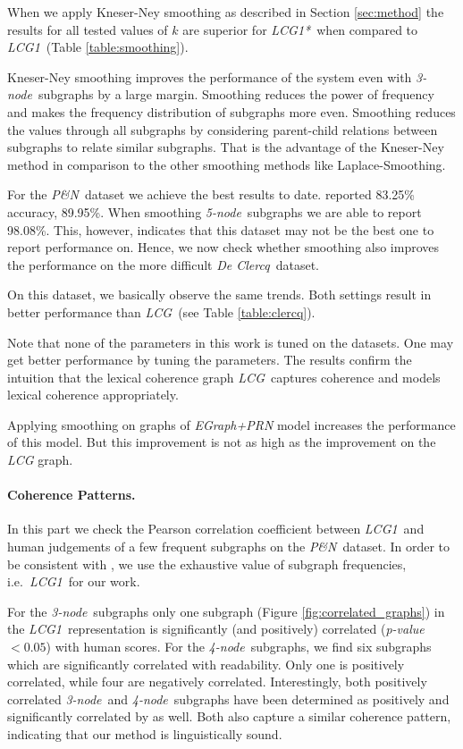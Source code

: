 When we apply Kneser-Ney smoothing as described in Section
\ref{sec:method} the results for all tested values of $k$ are superior
for \emph{LCG1*}\ when compared to \emph{LCG1}\ (Table
\ref{table:smoothing}).

Kneser-Ney smoothing improves the performance of the system even with
\emph{3-node}\ subgraphs by a large margin. Smoothing reduces the
power of frequency and makes the frequency distribution of subgraphs
more even. Smoothing reduces the values through all
subgraphs by considering parent-child relations between subgraphs to
relate similar subgraphs. That is the advantage of the Kneser-Ney
method in comparison to the other smoothing methods like
Laplace-Smoothing. 

For the \emph{P\&N}\ dataset we achieve the best results to
date.  reported 83.25\% accuracy, 
89.95\%. When smoothing \emph{5-node}\ subgraphs we are able to report
98.08\%. This, however, indicates that this dataset may not be the
best one to report performance on. Hence, we now check whether
smoothing also improves the performance on the more difficult
\emph{De Clercq}\ dataset.

On this dataset, we basically observe the same trends. Both settings result in better performance than \emph{LCG}\ (see Table \ref{table:clercq}). 

Note that none of the parameters in this work is tuned on the
datasets. One may get better performance by tuning the parameters.
The results confirm the intuition
that the lexical coherence graph \emph{LCG}\ captures coherence and
models lexical coherence appropriately.

Applying smoothing on graphs of \emph{EGraph+PRN} model increases the performance of this model. But this improvement is not as high as the improvement on the \emph{LCG} graph.

\paragraph{Coherence Patterns.}
In this part we check the Pearson correlation coefficient between
\emph{LCG1}\ and human judgements of a few frequent subgraphs on the
\emph{P\&N}\ dataset. In order to be consistent with
, we use the exhaustive value of subgraph
frequencies, i.e.\ \emph{LCG1}\ for our work.

For the \emph{3-node}\ subgraphs only one subgraph (Figure
\ref{fig:correlated_graphs}) in the \emph{LCG1}\ representation is
significantly (and positively) correlated (\emph{p-value}$<0.05$) with
human scores. For the \emph{4-node}\ subgraphs, we find six subgraphs
which are significantly correlated with readability. Only one is
positively correlated, while four are negatively
correlated. Interestingly, both positively correlated \emph{3-node}\
and \emph{4-node}\ subgraphs have been determined as positively and
significantly correlated by \newcite{mesgar15} as well. Both also
capture a similar coherence pattern, indicating that our method is
linguistically sound.

